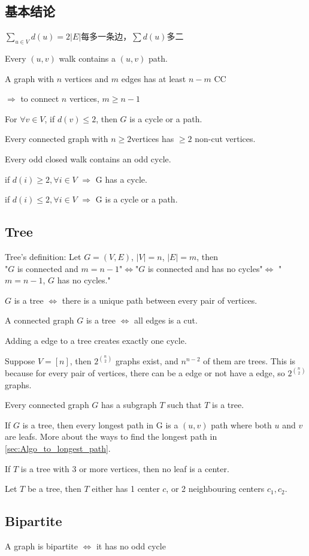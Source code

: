 \documentclass[12pt,a4paper]{ctexrep}
\begin{document}
\subsection{基本结论}
$\sum_{u \in V} d(u) = 2|E|$每多一条边，$\sum d(u)$多二

Every $(u,v)$ walk contains a $(u,v)$ path.

A graph with $n$ vertices and $m$ edges has at least $n-m$ CC

$\Rightarrow$ to connect $n$ vertices, $m \geq n-1$

For $\forall v \in V$, if $d(v)\leq 2$, then $G$ is a cycle or a path.

Every connected graph with $n \geq 2$vertices has $\geq 2$ non-cut vertices.

Every odd closed walk contains an odd cycle.

if $d(i) \geq 2, \forall i \in V$ $\Rightarrow$ G has a cycle.

if $d(i) \leq 2, \forall i \in V$ $\Rightarrow$ G is a cycle or a path.
\subsection{Tree}
Tree's definition: Let $G=(V,E)$, $|V|=n$, $|E|=m$, then \\
"$G$ is connected and $m=n-1$"$\iff$"$G$ is connected and has no cycles"$\iff$ "$m = n-1$, $G$ has no cycles."

$G$ is a tree $\iff$ there is a unique path between every pair of vertices.

A connected graph $G$ is a tree $\iff$ all edges is a cut.

Adding a edge to a tree creates exactly one cycle.

Suppose $V=[n]$, then $2^{\binom{n}{2}}$ graphs exist, and $n^{n-2}$ of them are trees. This is because for every pair of vertices, there can be a edge or not have a edge, so $2^{\binom{n}{2}}$ graphs.

Every connected graph $G$ has a subgraph $T$ such that $T$ is a tree.

If $G$ is a tree, then every longest path in G is a $(u,v)$ path where both $u$ and $v$ are leafs. More about the ways to find the longest path in \ref{sec:Algo_to_longest_path}.

If $T$ is a tree with 3 or more vertices, then no leaf is a center.

Let $T$ be a tree, then $T$ either has 1 center $c$, or 2 neighbouring centers $c_{1},c_{2}$.
\subsection{Bipartite}
A graph is bipartite $\iff$ it has no odd cycle
\end{document}
